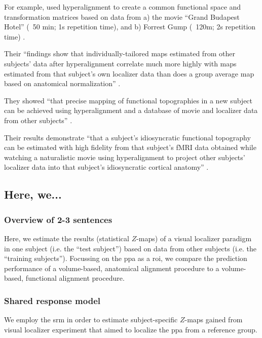 %
For example, \citep{jiahui2020predicting} used hyperalignment to create a common
functional space and transformation matrices based on data from a) the movie
``Grand Budapest Hotel'' (~50 min; 1s repetition time), and b) Forrest Gump
(~120m; 2s repetition time) \citep{hanke2016simultaneous}.

%
Their ``findings show that individually-tailored maps estimated from other
subjects’ data after hyperalignment correlate much more highly with maps
estimated from that subject's own localizer data than does a group average map
based on anatomical normalization'' \citep{jiahui2020predicting}.

%
They showed ``that precise mapping of functional topographies in a new subject
can be achieved using hyperalignment and a database of movie and localizer data
from other subjects'' \citep{jiahui2020predicting}.

%
Their results demonstrate ``that a subject's idiosyncratic functional topography
can be estimated with high fidelity from that subject's fMRI data obtained while
watching a naturalistic movie using hyperalignment to project other subjects'
localizer data into that subject's idiosyncratic cortical anatomy''
\citep{jiahui2020predicting}.


\subsection{Here, we...}


\subsubsection{Overview of 2-3 sentences}

Here, we estimate the results (statistical $Z$-maps) of a visual localizer
paradigm in one subject (i.e. the ``test subject'') based on data from other
subjects (i.e. the ``training subjects'').
%
Focussing on the \ac{ppa} as a \ac{roi}, we compare the prediction performance
of a volume-based, anatomical alignment procedure to a volume-based, functional
alignment procedure.



\subsubsection{Shared response model}

%
We employ the \ac{srm} \citep{chen2015reduced, richard2019fast} in order to
estimate subject-specific $Z$-maps gained from visual localizer experiment that
aimed to localize the \ac{ppa} from a reference group.

